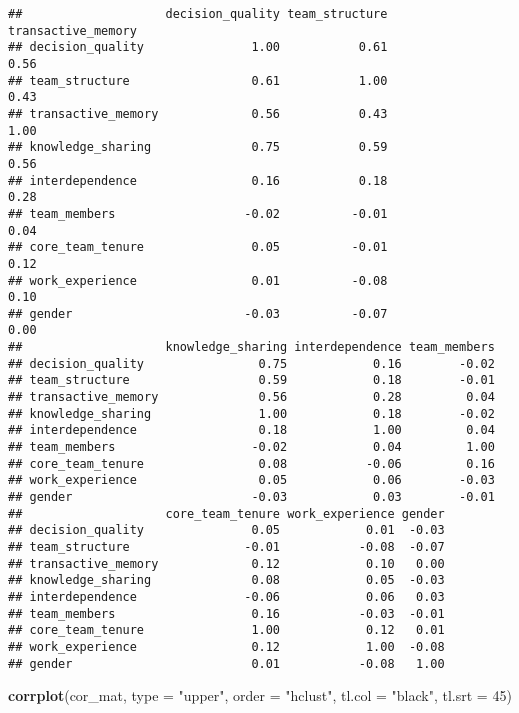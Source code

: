 \documentclass[]{article}
\newenvironment{Shaded}{\begin{snugshade}}{\end{snugshade}}
\newcommand{\DataTypeTok}[1]{\textcolor[rgb]{0.13,0.29,0.53}{#1}}
\newcommand{\DecValTok}[1]{\textcolor[rgb]{0.00,0.00,0.81}{#1}}
\newcommand{\KeywordTok}[1]{\textcolor[rgb]{0.13,0.29,0.53}{\textbf{#1}}}
\newcommand{\NormalTok}[1]{#1}
\newcommand{\StringTok}[1]{\textcolor[rgb]{0.31,0.60,0.02}{#1}}
\begin{document}
\begin{verbatim}
##                    decision_quality team_structure transactive_memory
## decision_quality               1.00           0.61               0.56
## team_structure                 0.61           1.00               0.43
## transactive_memory             0.56           0.43               1.00
## knowledge_sharing              0.75           0.59               0.56
## interdependence                0.16           0.18               0.28
## team_members                  -0.02          -0.01               0.04
## core_team_tenure               0.05          -0.01               0.12
## work_experience                0.01          -0.08               0.10
## gender                        -0.03          -0.07               0.00
##                    knowledge_sharing interdependence team_members
## decision_quality                0.75            0.16        -0.02
## team_structure                  0.59            0.18        -0.01
## transactive_memory              0.56            0.28         0.04
## knowledge_sharing               1.00            0.18        -0.02
## interdependence                 0.18            1.00         0.04
## team_members                   -0.02            0.04         1.00
## core_team_tenure                0.08           -0.06         0.16
## work_experience                 0.05            0.06        -0.03
## gender                         -0.03            0.03        -0.01
##                    core_team_tenure work_experience gender
## decision_quality               0.05            0.01  -0.03
## team_structure                -0.01           -0.08  -0.07
## transactive_memory             0.12            0.10   0.00
## knowledge_sharing              0.08            0.05  -0.03
## interdependence               -0.06            0.06   0.03
## team_members                   0.16           -0.03  -0.01
## core_team_tenure               1.00            0.12   0.01
## work_experience                0.12            1.00  -0.08
## gender                         0.01           -0.08   1.00
\end{verbatim}

\begin{Shaded}
\begin{Highlighting}[]
\KeywordTok{corrplot}\NormalTok{(cor_mat, }\DataTypeTok{type =} \StringTok{"upper"}\NormalTok{, }\DataTypeTok{order =} \StringTok{"hclust"}\NormalTok{, }\DataTypeTok{tl.col =} \StringTok{"black"}\NormalTok{, }\DataTypeTok{tl.srt =} \DecValTok{45}\NormalTok{)}
\end{Highlighting}
\end{Shaded}
\end{document}
